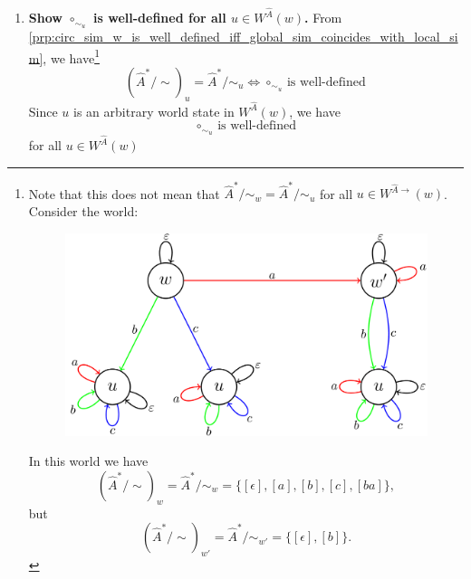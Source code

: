 \begin{proofE}
\begin{enumerate}
    \item \textbf{Show $\circ_{\sim_{u}}$ is well-defined for all $u \in W^{\hat{A}}(w)$.}
    From \cref{prp:circ_sim_w_is_well_defined_iff_global_sim_coincides_with_local_sim}, we have\footnote{
    Note that this does not mean that $\hat{A}^{*}/\sim_{w} = \hat{A}^{*}/\sim_{u}$ for all $u \in W^{\hat{A}\to}(w)$.
    Consider the world:
    \begin{figure}[H]
        \includegraphics[width=0.5\linewidth]{6BeyondSBDRLLocalAlgebras/Images/circ_sim_w_defined_does_not_mean_algebra_is_constant.png}
        \caption{}
    \end{figure}
    In this world we have
    \begin{equation}
        (\hat{A}^{*}/\sim)_{w} = \hat{A}^{*}/\sim_{w} = \{ [\epsilon], [a], [b], [c], [ba] \},
    \end{equation}
    but
    \begin{equation}
        (\hat{A}^{*}/\sim)_{w'} = \hat{A}^{*}/\sim_{w'} = \{ [\epsilon], [b] \}.
    \end{equation}
    }
    \begin{equation}
        (\hat{A}^{*}/\sim)_{u} = \hat{A}^{*}/\sim_{u} \iff \text{$\circ_{\sim_{u}}$ is well-defined}
    \end{equation}
    Since $u$ is an arbitrary world state in $W^{\hat{A}}(w)$, we have
    \begin{equation}
        \text{$\circ_{\sim_{u}}$ is well-defined}
    \end{equation}
    for all $u \in W^{\hat{A}}(w)$
\end{enumerate}
\end{proofE}


